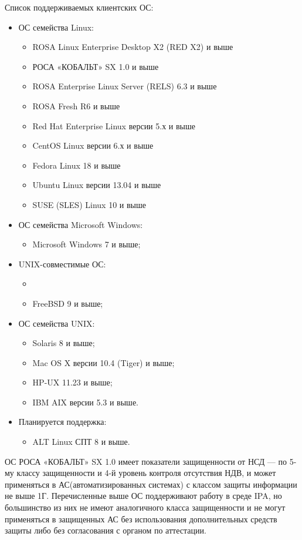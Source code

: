 \documentclass[a4paper,10pt,twoside]{article}
\begin{document}
Список поддерживаемых клиентских ОС:
\begin{itemize}
 \item ОС семейства Linux:
 \begin{itemize}
  \item ROSA Linux Enterprise Desktop X2 (RED X2) и выше
\item РОСА «КОБАЛЬТ» SX 1.0 и выше
\item ROSA Enterprise Linux Server (RELS) 6.3 и выше
\item ROSA Fresh R6 и выше
\item Red Hat Enterprise Linux версии 5.х и выше
\item CentOS Linux версии 6.х и выше
\item Fedora Linux 18 и выше
\item Ubuntu Linux версии 13.04 и выше
\item SUSE (SLES) Linux 10 и выше
 \end{itemize}
\item ОС семейства Microsoft Windows:
\begin{itemize}
 \item Microsoft Windows 7 и выше;
\end{itemize}
\item UNIX-совместимые ОС:
\begin{itemize}
 \item \item FreeBSD 9 и выше;
\end{itemize}
\item ОС семейства UNIX:
\begin{itemize}
 \item Solaris 8 и выше;
\item Mac OS X версии 10.4 (Tiger) и выше;
\item HP-UX 11.23 и выше;
\item IBM AIX версии 5.3 и выше.

\end{itemize}
\item Планируется поддержка:
\begin{itemize}
 \item ALT Linux СПТ 8 и выше.
\end{itemize}
\end{itemize}

ОС РОСА «КОБАЛЬТ» SX 1.0 имеет показатели защищенности от НСД — по 5-му классу защищенности и 4-й уровень контроля отсутствия НДВ, и может применяться в АС(автоматизированных системах) с классом защиты информации не выше 1Г. Перечисленные выше ОС поддерживают работу в среде IPA, но большинство из них не имеют аналогичного класса защищенности и не могут применяться в защищенных АС без использования дополнительных средств защиты либо без согласования с органом по аттестации.
\end{document}
